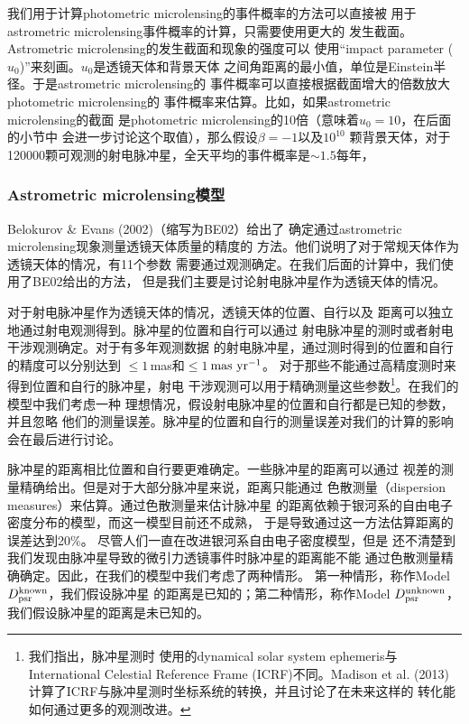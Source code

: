 我们用于计算photometric microlensing的事件概率的方法可以直接被
用于astrometric microlensing事件概率的计算，只需要使用更大的
发生截面。Astrometric microlensing的发生截面和现象的强度可以
使用“impact parameter ($u_0$)”来刻画。$u_0$是透镜天体和背景天体
之间角距离的最小值，单位是Einstein半径。于是astrometric microlensing的
事件概率可以直接根据截面增大的倍数放大photometric microlensing的
事件概率来估算。比如，如果astrometric microlensing的截面
是photometric microlensing的10倍（意味着$u_0=10$，在后面的小节中
会进一步讨论这个取值），那么假设$\beta=-1$以及$10^{10}$
颗背景天体，对于120000颗可观测的射电脉冲星，全天平均的事件概率是$\sim1.5$每年，

\subsubsection{Astrometric microlensing模型}

Belokurov \& Evans (2002)\supercite{Bel}（缩写为BE02）给出了
确定通过astrometric microlensing现象测量透镜天体质量的精度的
方法。他们说明了对于常规天体作为透镜天体的情况，有11个参数
需要通过观测确定。在我们后面的计算中，我们使用了BE02给出的方法，
但是我们主要是讨论射电脉冲星作为透镜天体的情况。

对于射电脉冲星作为透镜天体的情况，透镜天体的位置、自行以及
距离可以独立地通过射电观测得到。脉冲星的位置和自行可以通过
射电脉冲星的测时或者射电干涉观测确定。对于有多年观测数据
的射电脉冲星，通过测时得到的位置和自行的精度可以分别达到
$\leq 1$\,mas和$\leq 1$\,$\rm{mas\ yr^{-1}}$\supercite{verbiest}。
对于那些不能通过高精度测时来得到位置和自行的脉冲星，射电
干涉观测可以用于精确测量这些参数\footnote{我们指出，脉冲星测时
使用的dynamical solar system ephemeris与International Celestial 
Reference Frame (ICRF)不同。Madison et al. (2013)\supercite{Madison13}
计算了ICRF与脉冲星测时坐标系统的转换，并且讨论了在未来这样的
转化能如何通过更多的观测改进。}。在我们的模型中我们考虑一种
理想情况，假设射电脉冲星的位置和自行都是已知的参数，并且忽略
他们的测量误差。脉冲星的位置和自行的测量误差对我们的计算的影响
会在最后进行讨论。

脉冲星的距离相比位置和自行要更难确定。一些脉冲星的距离可以通过
视差的测量精确给出。但是对于大部分脉冲星来说，距离只能通过
色散测量（dispersion measures）来估算。通过色散测量来估计脉冲星
的距离依赖于银河系的自由电子密度分布的模型，而这一模型目前还不成熟，
于是导致通过这一方法估算距离的误差达到20\%\supercite{Taylor}。
尽管人们一直在改进银河系自由电子密度模型\supercite{cordes}，但是
还不清楚到我们发现由脉冲星导致的微引力透镜事件时脉冲星的距离能不能
通过色散测量精确确定。因此，在我们的模型中我们考虑了两种情形。
第一种情形，称作Model $D_{\rm{psr}}^{\rm{known}}$，我们假设脉冲星
的距离是已知的；第二种情形，称作Model $D_{\rm{psr}}^{\rm{unknown}}$，
我们假设脉冲星的距离是未已知的。

